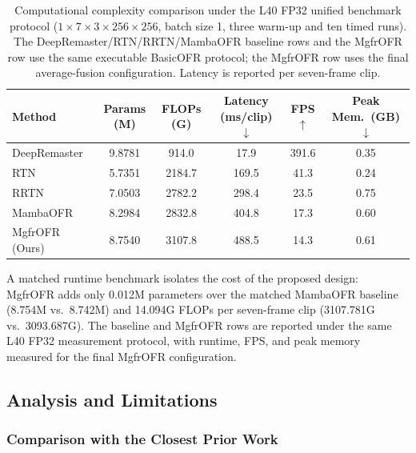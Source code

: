 \documentclass[symmetry,article,submit,pdftex,moreauthors]{Definitions/mdpi}
\begin{document}
\begin{table}[htbp]
\caption{Computational complexity comparison under the L40 FP32 unified benchmark protocol ($1{\times}7{\times}3{\times}256{\times}256$, batch size 1, three warm-up and ten timed runs). The DeepRemaster/RTN/RRTN/MambaOFR baseline rows and the MgfrOFR row use the same executable BasicOFR protocol; the MgfrOFR row uses the final average-fusion configuration. Latency is reported per seven-frame clip.\label{tab:complexity}}
\begin{tabularx}{\textwidth}{lCCCCC}
\toprule
\textbf{Method} & \textbf{Params (M)} & \textbf{FLOPs (G)} & \textbf{Latency (ms/clip)$\downarrow$} & \textbf{FPS$\uparrow$} & \textbf{Peak Mem.\ (GB)$\downarrow$} \\
\midrule
DeepRemaster~\cite{iizuka2019deepremaster}   & 9.8781 & 914.0  & 17.9  & 391.6 & 0.35 \\
RTN~\cite{wan2022rtn}                        & 5.7351 & 2184.7 & 169.5 & 41.3  & 0.24 \\
RRTN~\cite{lin2024rrtn}                      & 7.0503 & 2782.2 & 298.4 & 23.5  & 0.75 \\
MambaOFR~\cite{mao2025mambaofr}              & 8.2984 & 2832.8 & 404.8 & 17.3  & 0.60 \\
\midrule
MgfrOFR (Ours)                              & 8.7540 & 3107.8 & 488.5 & 14.3  & 0.61 \\
\bottomrule
\end{tabularx}
\end{table}

A matched runtime benchmark isolates the cost of the proposed design: MgfrOFR adds only 0.012M parameters over the matched MambaOFR baseline (8.754M vs.\ 8.742M) and 14.094G FLOPs per seven-frame clip (3107.781G vs.\ 3093.687G). The baseline and MgfrOFR rows are reported under the same L40 FP32 measurement protocol, with runtime, FPS, and peak memory measured for the final MgfrOFR configuration.

\FloatBarrier
\subsection{Analysis and Limitations}
\label{subsec:analysis_limitations}

\subsubsection{Comparison with the Closest Prior Work}
\label{subsec:vs_mambaofr}
\end{document}
